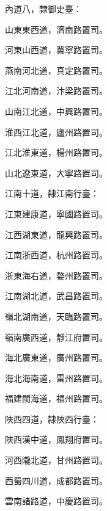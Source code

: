 \begin{pinyinscope}
 內道八，隸御史臺：



 山東東西道，濟南路置司。



 河東山西道，冀寧路置司。



 燕南河北道，真定路置司。



 江北河南道，汴梁路置司。



 山南江北道，中興路置司。



 淮西江北道，廬州路置司。



 江北淮東道，楊州路置司。



 山北遼東道，大寧路置司。



 江南十道，隸江南行臺：



 江東建康道，寧國路置司。



 江西湖東道，龍興路置司。



 江南浙西道，杭州路置司。



 浙東海右道，婺州路置司。



 江南湖北道，武昌路置司。



 嶺北湖南道，天臨路置司。



 嶺南廣西道，靜江府置司。



 海北廣東道，廣州路置司。



 海北海南道，雷州路置司。



 福建閩海道，福州路置司。



 陜西四道，隸陜西行臺：



 陜西漢中道，鳳翔府置司。



 河西隴北道，甘州路置司。



 西蜀四川道，成都路置司。



 雲南諸路道，中慶路置司。



\end{pinyinscope}